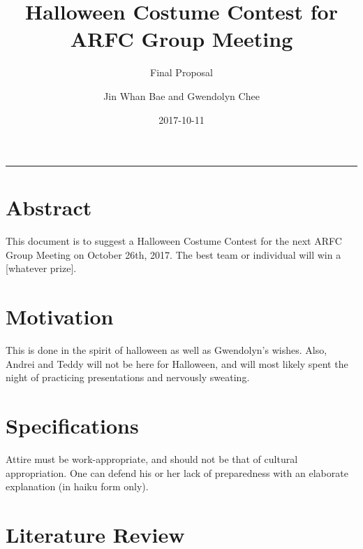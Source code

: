 \documentclass[12pt,letterpaper]{article}
\title{Halloween Costume Contest for ARFC Group Meeting}
\subtitle{Final Proposal}
\author{Jin Whan Bae and Gwendolyn Chee}
\date{2017-10-11}
\begin{document}
	
	\maketitle
	\hrule
	\onehalfspacing
	\thispagestyle{empty}

\section{Abstract}
This document is to suggest a Halloween Costume Contest for
the next ARFC Group Meeting on October 26th, 2017. The best
team or individual will win a [whatever prize].

\section{Motivation}
This is done in the spirit of halloween as well as Gwendolyn's wishes.
Also, Andrei and Teddy will not be here for Halloween,
and will most likely spent the night of practicing presentations
and nervously sweating. 

\section{Specifications}
Attire must be work-appropriate, and should not be
that of cultural appropriation. One can defend
his or her lack of preparedness with an elaborate
explanation (in haiku form only).


\section{Literature Review}
\end{document}
